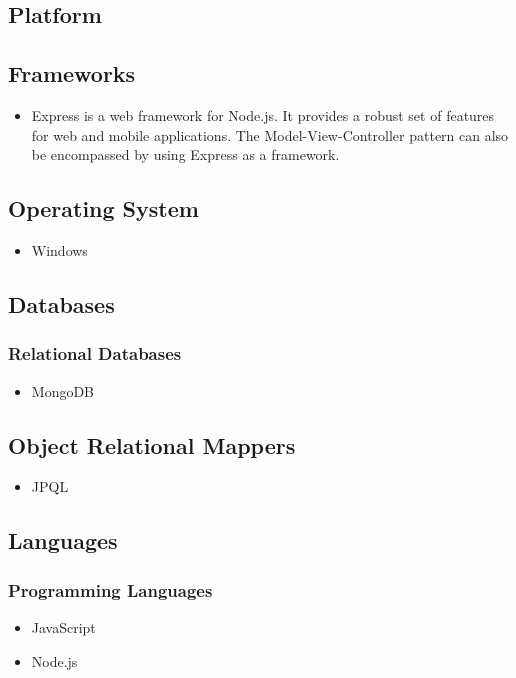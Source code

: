 \subsection{Platform}
\begin{itemize}
\end{itemize}


\subsection{Frameworks}
\begin{itemize}
		\item Express is a web framework for Node.js. It provides a robust set of features for web and mobile applications. The Model-View-Controller pattern can also be encompassed by using Express as a framework. 
\end{itemize}

\subsection{Operating System}
\begin{itemize}
		\item Windows
\end{itemize}
	
	
\subsection{Databases}
\subsubsection{Relational Databases}
\begin{itemize}
	\item MongoDB
\end{itemize}
	

\subsection{Object Relational Mappers}
\begin{itemize}
	\item JPQL
\end{itemize}

\subsection{Languages}
\subsubsection{Programming Languages}
\begin{itemize}
	\item JavaScript	
	\item Node.js
\end{itemize}

